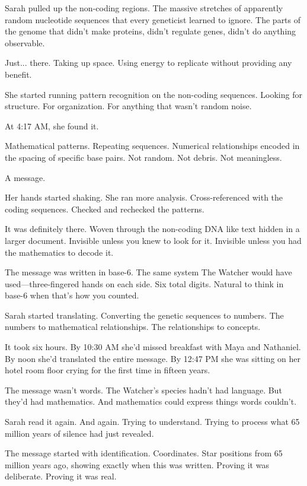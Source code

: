 Sarah pulled up the non-coding regions. The massive stretches of apparently random nucleotide sequences that every geneticist learned to ignore. The parts of the genome that didn't make proteins, didn't regulate genes, didn't do anything observable.

Just... there. Taking up space. Using energy to replicate without providing any benefit.

She started running pattern recognition on the non-coding sequences. Looking for structure. For organization. For anything that wasn't random noise.

At 4:17 AM, she found it.

Mathematical patterns. Repeating sequences. Numerical relationships encoded in the spacing of specific base pairs. Not random. Not debris. Not meaningless.

A message.

Her hands started shaking. She ran more analysis. Cross-referenced with the coding sequences. Checked and rechecked the patterns.

It was definitely there. Woven through the non-coding DNA like text hidden in a larger document. Invisible unless you knew to look for it. Invisible unless you had the mathematics to decode it.

The message was written in base-6. The same system The Watcher would have used—three-fingered hands on each side. Six total digits. Natural to think in base-6 when that's how you counted.

Sarah started translating. Converting the genetic sequences to numbers. The numbers to mathematical relationships. The relationships to concepts.

It took six hours. By 10:30 AM she'd missed breakfast with Maya and Nathaniel. By noon she'd translated the entire message. By 12:47 PM she was sitting on her hotel room floor crying for the first time in fifteen years.

\scenebreak

The message wasn't words. The Watcher's species hadn't had language. But they'd had mathematics. And mathematics could express things words couldn't.

Sarah read it again. And again. Trying to understand. Trying to process what 65 million years of silence had just revealed.

The message started with identification. Coordinates. Star positions from 65 million years ago, showing exactly when this was written. Proving it was deliberate. Proving it was real.

